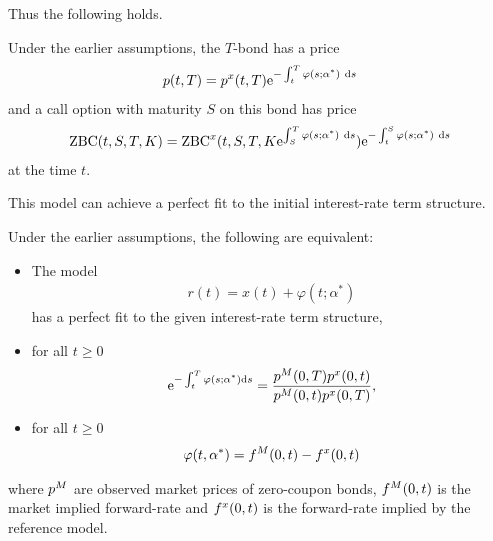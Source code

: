 Thus the following holds.

\begin{thm}
\label{bondandoptionpricesinextension}
	Under the earlier assumptions, the $T$-bond has a price
	\begin{align}
	\Bond(t,T) =  \Bond^x(t,T) \e^{ - \int_t^T \varphi(s; \alpha^*) \ \dx s}
	\end{align}
	and a call option with maturity $S$ on this bond has price
	\begin{align}
	\ZBC(t,S,T,K) =  \ZBC^x(t,S,T,K\e^{ \int_S^T \varphi(s; \alpha^*) \ \dx s}) \e^{ - \int_t^S \varphi(s; \alpha^*) \ \dx s}
	\end{align}
	at the time $t$. 	
\end{thm}

This model can achieve a perfect fit to the initial interest-rate term structure.

\begin{thm}
\label{extensionequivalentandfactor}
	Under the earlier assumptions, the following are equivalent:
\begin{itemize} 
	\item The model
		\begin{align}
			r(t) = x(t) + \varphi(t; \alpha^*)
		\end{align}
	has a perfect fit to the given interest-rate term structure,
	\item for all $t \geq 0$
		\begin{align}
			\mathrm{e}^{-\int_t^T \varphi(s; \alpha^*) \mathrm{d} s} = \frac{p^M(0,T) p^x(0,t)}{p^M(0,t) p^x(0,T)}, 
		\end{align}
	\item for all $t \geq 0$
	\begin{align}
		\varphi( t, \alpha^*) = f^M(0,t) - f^x(0,t)
	\end{align}
\end{itemize}
where $p^M$ are observed market prices of zero-coupon bonds, $f^M(0,t)$ is the market implied forward-rate and $f^x(0,t)$ is the forward-rate implied by the reference model.
\end{thm}

